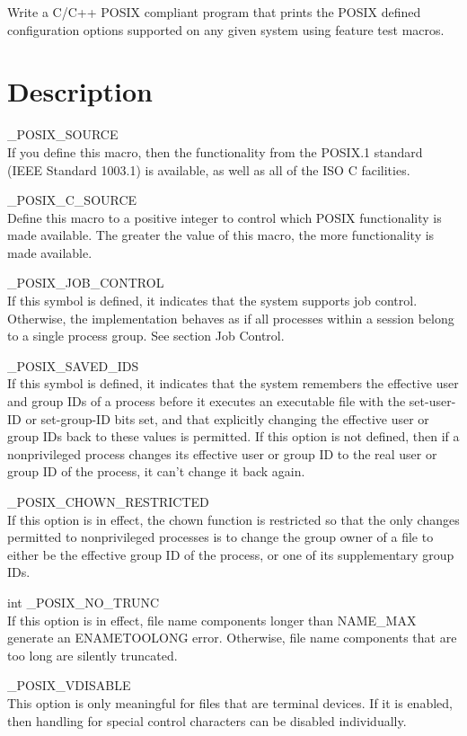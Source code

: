 Write a C/C++ POSIX compliant program that prints the POSIX defined configuration options supported on any given system using feature test macros.

\section{Description}

\begin{description}

	\item \_POSIX\_SOURCE \hfill \\
		If you define this macro, then the functionality from the POSIX.1 standard (IEEE Standard 1003.1) is available, as well as all of the ISO C facilities.
	\item \_POSIX\_C\_SOURCE \hfill \\
		Define this macro to a positive integer to control which POSIX functionality is made available. The greater the value of this macro, the more functionality is made available.
	\item \_POSIX\_JOB\_CONTROL \hfill \\
		If this symbol is defined, it indicates that the system supports job control. Otherwise, the implementation behaves as if all processes within a session belong to a single process group. See section Job Control.
	\item \_POSIX\_SAVED\_IDS \hfill \\
		If this symbol is defined, it indicates that the system remembers the effective user and group IDs of a process before it executes an executable file with the set-user-ID or set-group-ID bits set, and that explicitly changing the effective user or group IDs back to these values is permitted. If this option is not defined, then if a nonprivileged process changes its effective user or group ID to the real user or group ID of the process, it can't change it back again.
	\item \_POSIX\_CHOWN\_RESTRICTED \hfill \\
		If this option is in effect, the chown function is restricted so that the only changes permitted to nonprivileged processes is to change the group owner of a file to either be the effective group ID of the process, or one of its supplementary group IDs. 
	\item int \_POSIX\_NO\_TRUNC \hfill \\
		If this option is in effect, file name components longer than NAME\_MAX generate an ENAMETOOLONG error. Otherwise, file name components that are too long are silently truncated.
	\item \_POSIX\_VDISABLE \hfill \\
		This option is only meaningful for files that are terminal devices. If it is enabled, then handling for special control characters can be disabled individually.
	
\end{description}

